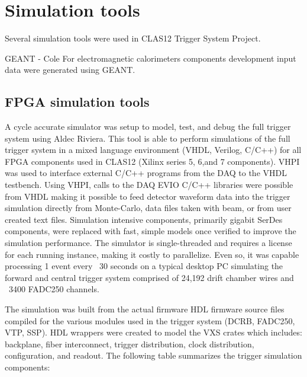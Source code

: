 \section{Simulation tools}

Several simulation tools were used in CLAS12 Trigger System Project.

GEANT - Cole
For electromagnetic calorimeters components development input data were generated using GEANT.

\subsection{FPGA simulation tools}
A cycle accurate simulator was setup to model, test, and debug the full trigger system using Aldec Riviera. This tool is able to perform simulations of the full trigger system in a mixed language environment (VHDL, Verilog, C/C++) for all FPGA components used in CLAS12 (Xilinx series 5, 6,and 7 components). VHPI was used to interface external C/C++ programs from the DAQ to the VHDL testbench. Using VHPI, calls to the DAQ EVIO C/C++ libraries were possible from VHDL making it possible to feed detector waveform data into the trigger simulation directly from Monte-Carlo, data files taken with beam, or from user created text files. Simulation intensive components, primarily gigabit SerDes components, were replaced with fast, simple models once verified to improve the simulation performance. The simulator is single-threaded and requires a license for each running instance, making it costly to parallelize. Even so, it was capable processing 1 event every ~30 seconds on a typical desktop PC simulating the forward and central trigger system comprised of 24,192 drift chamber wires and ~3400 FADC250 channels.

The simulation was built from the actual firmware HDL firmware source files compiled for the various modules used in the trigger system (DCRB, FADC250, VTP, SSP). HDL wrappers were created to model the VXS crates which includes: backplane, fiber interconnect, trigger distribution, clock distribution, configuration, and readout. The following table summarizes the trigger simulation components:

